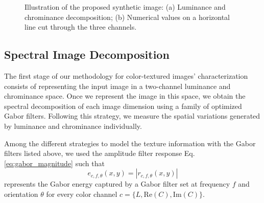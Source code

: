 \documentclass[journal]{IEEEtran}
\newcommand{\RE}{\mathrm{Re}}
\newcommand{\IM}{\mathrm{Im}}
\begin{document}
\begin{figure}[!ht]
\centering
\caption{Illustration of the proposed synthetic image: (a) Luminance and chrominance decomposition; (b) Numerical values on a horizontal line cut through the three channels.}\label{fig:three_channel_decomposition}
\end{figure}

\subsection{Spectral Image Decomposition}
The first stage of our methodology for color-textured images' characterization consists of representing the input image in a two-channel luminance and chrominance space. Once we represent the image in this space, we obtain the spectral decomposition of each image dimension using a family of optimized Gabor filters. Following this strategy, we measure the spatial variations generated by luminance and chrominance individually. 


Among the different strategies to model the texture information with the Gabor filters listed above, we used the amplitude filter response Eq. \eqref{eq:gabor_magnitude} such that
\begin{equation}\label{eq:gabor_energy}
	e_{c, f, \theta}(x,y) = |r_{c, f, \theta}(x,y)|
\end{equation}
represents the Gabor energy captured by a Gabor filter set at frequency $f$ and orientation $\theta$ for every color channel  $c=\{L, \RE(C), \IM(C)\}$. 
\end{document}
